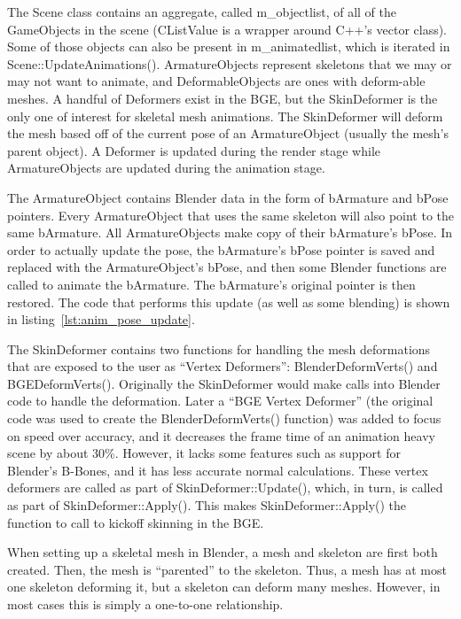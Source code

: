 The Scene class contains an aggregate, called m\_objectlist, of all of the GameObjects in the scene (CListValue is a wrapper around C++'s vector class).
Some of those objects can also be present in m\_animatedlist, which is iterated in Scene::UpdateAnimations().
ArmatureObjects represent skeletons that we may or may not want to animate, and DeformableObjects are ones with deform-able meshes.
A handful of Deformers exist in the BGE, but the SkinDeformer is the only one of interest for skeletal mesh animations.
The SkinDeformer will deform the mesh based off of the current pose of an ArmatureObject (usually the mesh's parent object).
A Deformer is updated during the render stage while ArmatureObjects are updated during the animation stage.

The ArmatureObject contains Blender data in the form of bArmature and bPose pointers.
Every ArmatureObject that uses the same skeleton will also point to the same bArmature.
All ArmatureObjects make copy of their bArmature's bPose.
In order to actually update the pose, the bArmature's bPose pointer is saved and replaced with the ArmatureObject's bPose, and then some Blender functions are called to animate the bArmature.
The bArmature's original pointer is then restored.
The code that performs this update (as well as some blending) is shown in listing~\ref{lst:anim_pose_update}.


The SkinDeformer contains two functions for handling the mesh deformations that are exposed to the user as ``Vertex Deformers'': BlenderDeformVerts() and BGEDeformVerts().
Originally the SkinDeformer would make calls into Blender code to handle the deformation.
Later a ``BGE Vertex Deformer'' (the original code was used to create the BlenderDeformVerts() function) was added to focus on speed over accuracy, and it decreases the frame time of an animation heavy scene by about 30\%.
However, it lacks some features such as support for Blender's B-Bones, and it has less accurate normal calculations.
These vertex deformers are called as part of SkinDeformer::Update(), which, in turn, is called as part of SkinDeformer::Apply().
This makes SkinDeformer::Apply() the function to call to kickoff skinning in the BGE.

When setting up a skeletal mesh in Blender, a mesh and skeleton are first both created.
Then, the mesh is ``parented'' to the skeleton.
Thus, a mesh has at most one skeleton deforming it, but a skeleton can deform many meshes.
However, in most cases this is simply a one-to-one relationship.

